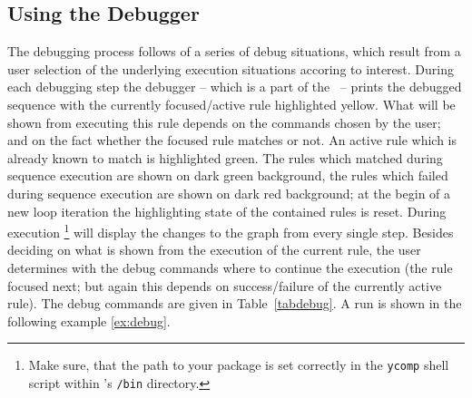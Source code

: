 \subsection{Using the Debugger}

The debugging process follows of a series of debug situations,
which result from a user selection of the underlying execution situations accoring to interest.
During each debugging step the debugger -- which is a part of the \GrShell~-- 
prints the debugged sequence with the currently focused/active rule highlighted yellow.
What will be shown from executing this rule depends on the commands chosen by the user;
and on the fact whether the focused rule matches or not.
An active rule which is already known to match is highlighted green.
The rules which matched during sequence execution are shown on dark green background,
the rules which failed during sequence execution are shown on dark red background;
at the begin of a new loop iteration the highlighting state of the contained rules is reset.
During execution \yComp\footnote{Make sure, that the path to your \texttt{} package is set correctly in the \texttt{ycomp} shell script within \GrG's \texttt{/bin} directory.}
will display the changes to the graph from every single step. 
Besides deciding on what is shown from the execution of the current rule, 
the user determines with the debug commands where to continue the execution
(the rule focused next; but again this depends on success/failure of the currently active rule).
The debug commands are given in Table~\ref{tabdebug}.
A run is shown in the following example \ref{ex:debug}.

